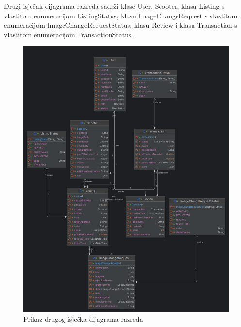 Drugi isječak dijagrama razreda sadrži klase User, Scooter, klasu Listing s vlastitom enumeracijom ListingStatus, klasu ImageChangeRequest s vlastitom enumeracijom ImageChangeRequestStatus, klasu Review i klasu Transaction s vlastitom enumeracijom TransactionStatus.
\begin{figure} [H]

	\includegraphics[width=1\linewidth]{slike/ClassDiagram2.png}
	\centering
	\caption{Prikaz drugog isječka dijagrama razreda}
	\label{fig:Prikaz drugog isječka dijagrama razreda}
\end{figure}

